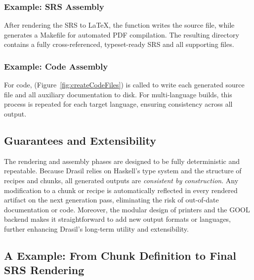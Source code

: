 \subsubsection{Example: SRS Assembly}

After rendering the \gb{} SRS to \LaTeX{}, the  function 
writes the source file, while  generates a Makefile for 
automated PDF compilation. The resulting directory contains a fully 
cross-referenced, typeset-ready SRS and all supporting files.

\subsubsection{Example: Code Assembly}

For code,  (Figure~\ref{fig:createCodeFiles}) is called 
to write each generated source file and all auxiliary documentation to disk. 
For multi-language builds, this process is repeated for each target language, 
ensuring consistency across all output.



\subsection{Guarantees and Extensibility}

The rendering and assembly phases are designed to be fully deterministic and 
repeatable. Because Drasil relies on Haskell's type system and the structure of 
recipes and chunks, all generated outputs are \emph{consistent by 
construction}. Any 
modification to a chunk or recipe is automatically reflected in every rendered 
artifact on the next generation pass, eliminating the risk of out-of-date 
documentation or code.
Moreover, the modular design of printers and the GOOL backend makes it 
straightforward to add new output formats or languages, further enhancing 
Drasil's long-term utility and extensibility.

\subsection{A \gb{} Example: From Chunk Definition to Final SRS Rendering}


